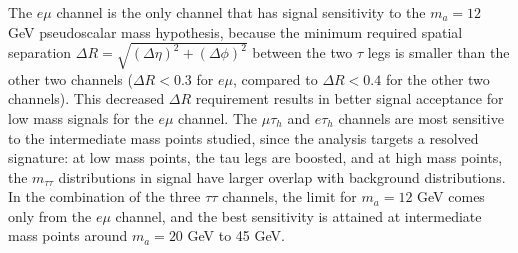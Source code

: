 The $e\mu$ channel is the only channel that has signal sensitivity to the $m_a = 12$ GeV pseudoscalar mass hypothesis, because the minimum required spatial separation $\Delta R = \sqrt{(\Delta \eta)^2 + (\Delta \phi)^2}$ between the two $\tau$ legs is smaller than the other two channels ($\Delta R < 0.3$ for $e\mu$, compared to $\Delta R < 0.4$ for the other two channels). This decreased $\Delta R$ requirement results in better signal acceptance for low mass signals for the $e\mu$ channel. The $\mu\tau_{h}$ and $e\tau_{h}$ channels are most sensitive to the intermediate mass points studied, since the analysis targets a resolved signature: at low mass points, the tau legs are boosted, and at high mass points, the $m_{\tau\tau}$ distributions in signal have larger overlap with background distributions. In the combination of the three $\tau\tau$ channels, the limit for $m_a = 12$ GeV comes only from the $e\mu$ channel, and the best sensitivity is attained at intermediate mass points around $m_a = 20$ GeV to 45 GeV.


